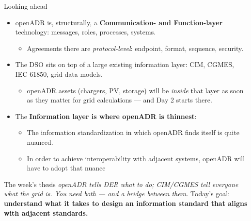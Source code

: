 \begin{frame}{Looking ahead}
  \footnotesize
  \setlength{\itemsep}{1pt}
  \setlength{\parsep}{0pt}

  \begin{itemize}
    \item openADR is, structurally, a \textbf{Communication- and Function-layer} technology: messages, roles, processes, systems.
    \begin{itemize}
      \item Agreements there are \emph{protocol-level}: endpoint, format, sequence, security.
    \end{itemize}
    \pause
    \item The DSO sits on top of a large existing information layer: \alert{CIM, CGMES, IEC 61850, grid data models}.
    \begin{itemize} 
      \item openADR assets (chargers, PV, storage) will be \emph{inside} that layer as soon as they matter for grid calculations — and Day 2 starts there.
    \end{itemize}
    \pause
    \item The \textbf{Information layer is where openADR is thinnest}:
    \begin{itemize}
      \item The information standardization in which openADR finds itself is quite nuanced.
      \item In order to achieve interoperability with adjacent systems, openADR will have to adopt that nuance
    \end{itemize}

  \end{itemize}

  \vspace{0.15cm}
  \begin{alertblock}{The week's thesis}
    \emph{openADR tells DER what to do; CIM/CGMES tell everyone what the grid \emph{is}. You need both — and a bridge between them.}
    \vspace{0.1cm}
    \alert{Today's goal:} \textbf{understand what it takes to design an information standard that aligns with adjacent standards.} 
  \end{alertblock}
\end{frame}
